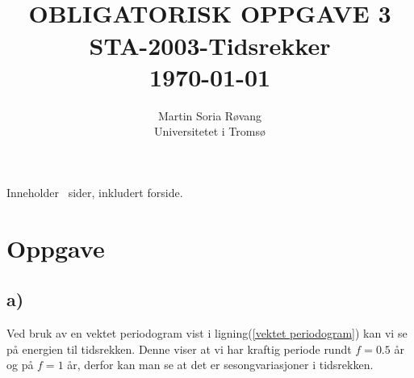 
\usepackage{gensymb}
\usepackage{amsmath}
\usepackage{amsfonts}
\usepackage[section]{placeins}



{\selectfont
\title{ \normalsize \textsc{}
		\\ [1.0cm] %
        \LARGE \textbf{\uppercase{Obligatorisk Oppgave 3}
        \HRule{0.5pt} \\ [0.5cm]
        STA-2003-Tidsrekker
        \\
		\normalsize \today \vspace*{5\baselineskip}}
		}

        \date{}
\author{
		Martin Soria Røvang \\ 
        Universitetet i Tromsø\\}

\clearpage\maketitle
\vspace{0.2\textheight}
{\centering
Inneholder \pageref{LastPage} \, sider, inkludert forside.\par
}}
\thispagestyle{empty}

\newpage
\tableofcontents

\newpage

\section{Oppgave}
\subsection{a)}

Ved bruk av en vektet periodogram vist i ligning(\ref{vektet periodogram}) kan vi se på energien til tidsrekken. Denne viser at vi har kraftig periode rundt $f = 0.5$ år og på $f = 1$ år, derfor kan man se at det er sesongvariasjoner i tidsrekken.

